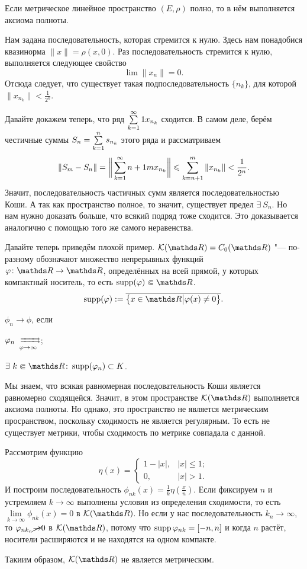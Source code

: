 \begin{Lem}
  Если метрическое линейное пространство $(E,\rho) $ полно, то в нём выполняется аксиома полноты.
\end{Lem}
\begin{Proof}
Нам задана последовательность, которая стремится к нулю. Здесь нам понадобися квазинорма $\|x\| = \rho(x,0)$. Раз последовательность стремится к нулю, выполняется следующее свойство
\[
  \lim\|x_n\|=0.
\]
Отсюда следует, что существует такая подпоследовательность $\{n_k\}$, для которой $\|x_{n_k}\|<\frac1{2^k}$. 

Давайте докажем теперь, что ряд $\rY k1x_{n_k}$ сходится. В самом деле, берём честичные суммы $S_n = \RY k1ns_{n_k}$ этого ряда и рассматриваем
\[
  \|S_m-S_n\| = \bigg\|\rY k{n+1}mx_{n_k}\bigg\|\le
  \RY k{n+1}m\|x_{n_k}\|<\frac1{2^n}.
\]
Значит, последовательность частичных сумм является последовательностью Коши. А так как пространство полное, то значит, существует предел $\exists\ S_n$. Но нам нужно доказать больше, что всякий подряд тоже сходится. Это доказывается аналогично с помощью того же самого неравенства.
\end{Proof}
Давайте теперь приведём плохой пример. $\mathcal K(\R) = C_0(\R)$ "--- по-разному обозначают множество непрерывных функций $\phi\colon \R\to\R$, определённых на всей прямой, у которых компактный носитель, то есть $\supp(\phi) \spp \R$.
\[
  \supp(\phi):=\overline{\big\{x\in\R\big|\phi(x)\ne0\big\}}.
\]
\begin{Def}
  $\phi_n\to\phi$, если
\begin{roItems}
\item $\phi_n \rsh[]\phi$;
\item $\exists\ k\spp\R\colon \supp(\phi_n)\subset K$.
\end{roItems}
\end{Def}

Мы знаем, что всякая равномерная последовательность Коши является равномерно сходящейся. Значит, в этом пространстве $\mathcal K(\R)$ выполняется аксиома полноты. Но однако, это пространство не является метрическим просранством, поскольку сходимость не является регулярным. То есть не существует метрики, чтобы сходимость по метрике совпадала с данной.

\begin{Proof}
Рассмотрим функцию
\[
\eta(x) = \begin{cases}
  1-|x|,&|x|\le1;\\
 0,&|x|>1.
\end{cases}
\]
И построим последовательность $\phi_{nk}(x) = \frac1k\eta\left(\frac xn\right)$. Если фиксируем $n$ и устремляем $k\to\infty$ выполнены условия из определения сходимости, то есть $\lim\limits_{k\to\infty}\phi_{nk}(x) = 0$ в $\mathcal K(\R)$. Но если у нас последовательность $k_n\to\infty$, то $\phi_{nk_n}\cancel{\to}0$ в $\mathcal K(\R)$, потому что $\supp\phi_{nk} = [-n,n]$ и когда $n$ растёт, носители расширяются и не находятся на одном компакте. 

Такиим образом, $\mathcal K(\R)$ не является метрическим.
\end{Proof}

